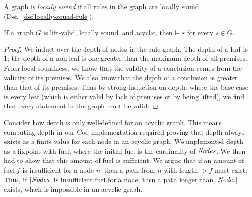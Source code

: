 \begin{definition}
    A graph is \emph{locally sound} if
    all rules in the graph are locally sound
    (Def.~\ref{def:locally-sound-rule}).
\end{definition}

\begin{lemma}
    \label{lem:acyclic-soundness}
    If a graph $G$ is lift-valid, locally sound, and acyclic,
    then $\vDash s$ for every $s \in G$.
\end{lemma}

\begin{proof}
We induct over the depth of nodes in the rule graph.
The depth of a leaf is 1;
the depth of a non-leaf is one greater than the maximum depth of all premises.
From local soundness, we know that the validity of a conclusion
comes from the validity of its premises. 
We also know that the depth of a conclusion is greater than that of its premises.
Thus by strong induction on depth,
where the base case is every leaf
(which is either valid by lack of premises or by being lifted),
we find that every statement in the graph must be valid.

\end{proof}

Consider how depth is only well-defined for an acyclic graph.
This means computing depth in our Coq implementation required
proving that depth always exists as a finite value for each node in an acyclic graph.
We implemented depth as a fixpoint with fuel, where the initial fuel is the cardinality of $\mathit{Nodes}$.
We then had to show that this amount of fuel is sufficient. We argue that if an amount of fuel $f$ is insufficient for a node $n$,
then a path from $n$ with length $> f$ must exist.
Thus, if $\left|\mathit{Nodes}\right|$ is insufficient fuel for a node,
then a path longer than $\left|\mathit{Nodes}\right|$ exists,
which is impossible in an acyclic graph.

\iffalse
\begin{lemma}
    Consider a graph $G=(\DomNode,\MapConc,\MapRule,\MapPrems)$,
    and a node $\node \in \DomNode$.
    If the subgraph of $G$ w.r.t.\ $\node$ is acyclic and valid,
    and all rules in the image of $\MapRule$ are locally sound,
    then $\VAL \MapConc(\node)$.
\end{lemma}
\fi

